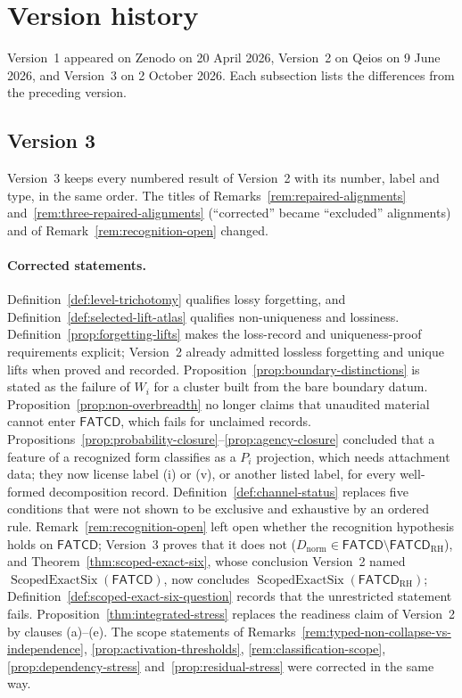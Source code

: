 \documentclass[11pt]{article}
\theoremstyle{definition}
\newcommand{\FATCD}{\ensuremath{\mathsf{FATCD}}}
\begin{document}
 \section{Version history}\label{app:version-history}

Version~1 appeared on Zenodo on 20 April 2026, Version~2 on Qeios on 9 June
2026, and Version~3 on 2 October 2026. Each subsection lists the differences
from the preceding version.

\subsection{Version 3}

Version~3 keeps every numbered result of Version~2 with its number, label and
type, in the same order. The titles of Remarks~\ref{rem:repaired-alignments}
and~\ref{rem:three-repaired-alignments} (``corrected'' became ``excluded''
alignments) and of Remark~\ref{rem:recognition-open} changed.

\paragraph{Corrected statements.} Definition~\ref{def:level-trichotomy}
qualifies lossy forgetting, and Definition~\ref{def:selected-lift-atlas}
qualifies non-uniqueness and lossiness.
Definition~\ref{prop:forgetting-lifts} makes the loss-record and
uniqueness-proof requirements explicit; Version~2 already admitted
lossless forgetting and unique lifts when proved and recorded.
Proposition~\ref{prop:boundary-distinctions} is stated as the failure of
\(W_i\) for a cluster built from the bare boundary datum.
Proposition~\ref{prop:non-overbreadth} no longer claims that unaudited
material cannot enter \FATCD{}, which fails for unclaimed records.
Propositions~\ref{prop:probability-closure}--\ref{prop:agency-closure}
concluded that a feature of a recognized form classifies as a \(P_i\)
projection, which needs attachment data; they now license label (i) or (v),
or another listed label, for every well-formed decomposition record.
Definition~\ref{def:channel-status} replaces five conditions that were not
shown to be exclusive and exhaustive by an ordered rule.
Remark~\ref{rem:recognition-open} left open whether the recognition
hypothesis holds on \FATCD{}; Version~3 proves that it does not
(\(D_{\mathrm{norm}}\in\FATCD\setminus\FATCD_{\mathrm{RH}}\)), and
Theorem~\ref{thm:scoped-exact-six}, whose conclusion Version~2 named
\(\operatorname{ScopedExactSix}(\FATCD)\), now concludes
\(\operatorname{ScopedExactSix}(\FATCD_{\mathrm{RH}})\);
Definition~\ref{def:scoped-exact-six-question} records that the unrestricted
statement fails. Proposition~\ref{thm:integrated-stress} replaces the
readiness claim of Version~2 by clauses (a)--(e). The scope statements of
Remarks~\ref{rem:typed-non-collapse-vs-independence},
\ref{prop:activation-thresholds}, \ref{rem:classification-scope},
\ref{prop:dependency-stress} and~\ref{prop:residual-stress} were corrected
in the same way.
\end{document}
